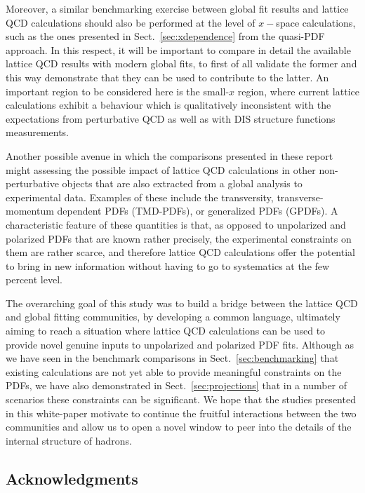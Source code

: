 Moreover, a similar benchmarking exercise between global fit results and lattice
QCD calculations should also be performed at the level of
$x-$space calculations, such as the ones presented in Sect.~\ref{sec:xdependence}
from the quasi-PDF approach.
%
In this respect, it will be important to compare in detail the available lattice
QCD results with modern global fits, to first of all validate the former and
this way demonstrate that they can be used to contribute to the latter.
%
An important region to be considered here is the small-$x$ region, where current lattice
calculations exhibit a behaviour which is qualitatively inconsistent with
the expectations from perturbative QCD as well as with DIS structure functions measurements.

Another possible avenue in which the comparisons presented in these report might assessing
the possible impact of lattice QCD calculations in other non-perturbative objects that
are also extracted from a global analysis to experimental data.
%
Examples of these include the transversity, transverse-momentum dependent PDFs (TMD-PDFs),
or generalized PDFs (GPDFs).
%
A characteristic feature of these quantities is that, as opposed to unpolarized and
polarized PDFs that are known rather precisely, the experimental constraints on them
are rather scarce, and therefore lattice QCD calculations offer the potential
to bring in new information without having to go to systematics at the few percent level.

The overarching goal of this study was to build a bridge between the lattice QCD
and global fitting communities, by developing a common language, ultimately
aiming to reach a situation where
lattice QCD calculations can be used to provide novel genuine inputs
to unpolarized and polarized PDF fits.
%
Although as we have seen in the benchmark comparisons in Sect.~\ref{sec:benchmarking} that
existing calculations are not yet able to provide meaningful constraints on the
PDFs, we have also demonstrated in Sect.~\ref{sec:projections} that in a number
of scenarios these constraints can be significant.
%
We hope that the studies presented in this white-paper motivate to continue the fruitful
interactions between the two communities and allow us to open a novel window
to peer into the details of the internal structure of hadrons.


\subsection*{Acknowledgments}

